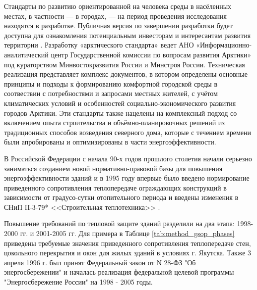 Стандарты по развитию ориентированной на человека среды в насёленных местах, в частности --- в городах, --- на период проведения исследования находятся в разработке.
Публичная версия по завершении разработки будет доступна для ознакомления потенциальным инвесторам и интересантам развития территории \cite{law_RU_govAggregatorArcticStandart}.
Разработку «арктического стандарта» ведет АНО «Информационно-аналитический центр
Государственной комиссии по вопросам развития Арктики» под кураторством Минвостокразвития России и Минстроя России.
Техническая реализация представляет комплекс документов, в котором определены основные принципы и подходы к формированию
комфортной городской среды в соотвествии с потребностями и запросами местных жителей, с учётом климатических условий и особенностей социально-экономического развития городов Арктики.
Эти стандарты также нацелены на комплексный подход со включением опыта строительства и объёмно-планировочных решений из традиционных способов возведения северного дома,
которые с течением времени были апробированы и оптимизированы в части энергоэффективности.

В Российской Федерации с начала 90-х годов прошлого столетия начали серьезно заниматься созданием новой нормативно-правовой базы для повышения энергоэффективности зданий и
в 1995 году впервые было введено нормирование приведенного сопротивления теплопередаче ограждающих конструкций в зависимости от градусо-сутки отопительного периода
и введены изменения в СНиП II-3-79* <<Строительная теплотехника>> \Code{[14]}.

Повышение требований по тепловой защите зданий разделили на два этапа: 1998-2000 гг. и 2001-2005 гг.
Для примера в Таблице \ref{tab:method_gsop_phases} приведены требуемые значения приведенного сопротивления теплопередаче стен, цокольного перекрытия и окон для жилых зданий в условиях г. Якутска.
Также 3 апреля 1996 г. был принят Федеральный закон от N 28-ФЗ "Об энергосбережении" и началась реализация федеральной целевой программы "Энергосбережение России" на 1998 - 2005 годы.

